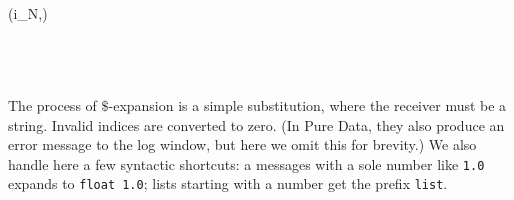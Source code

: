 \begin{hscode}
\\
\>[7]{}\<[10]%
\>[10]{}\;\;(i_{N},)\;\;\<[E]%
\\
\>[4]{}\<[7]%
\>[7]{}\;\to {}\<[E]%
\\
\>[7]{}\<[10]%
\>[10]{}\;\;\;\;\<[E]%
\\
\>[4]{}\<[7]%
\>[7]{}\to {}\<[E]%
\\
\>[7]{}\<[10]%
\>[10]{}\;\<[E]%
\ColumnHook
\end{hscode}\resethooks

The process of $\$$-expansion is a simple substitution, where the receiver
must be a string. Invalid indices are converted to zero. (In Pure Data, they
also produce an error message to the log window, but here we omit this for
brevity.) We also handle here a few syntactic shortcuts: a messages with a
sole number like \texttt{1.0} expands to \texttt{float 1.0}; lists starting
with a number get the prefix \texttt{list}.


